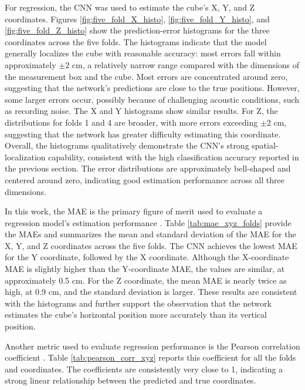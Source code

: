 For regression, the CNN was used to estimate the cube's X, Y, and Z coordinates. Figures \ref{fig:five_fold_X_histo}, \ref{fig:five_fold_Y_histo}, and \ref{fig:five_fold_Z_histo} show the prediction-error histograms for the three coordinates across the five folds. The histograms indicate that the model generally localizes the cube with reasonable accuracy: most errors fall within approximately $\pm 2$ cm, a relatively narrow range compared with the dimensions of the measurement box and the cube. Most errors are concentrated around zero, suggesting that the network's predictions are close to the true positions. However, some larger errors occur, possibly because of challenging acoustic conditions, such as recording noise. The X and Y histograms show similar results. For Z, the distributions for folds 1 and 4 are broader, with more errors exceeding $\pm 2$ cm, suggesting that the network has greater difficulty estimating this coordinate. Overall, the histograms qualitatively demonstrate the CNN's strong spatial-localization capability, consistent with the high classification accuracy reported in the previous section. The error distributions are approximately bell-shaped and centered around zero, indicating good estimation performance across all three dimensions.

In this work, the MAE is the primary figure of merit used to evaluate a regression model's estimation performance \cite{friedmanrecomendation}. Table \ref{tab:mae_xyz_folds} provide the MAEs and summarizes the mean and standard deviation of the MAE for the X, Y, and Z coordinates across the five folds. The CNN achieves the lowest MAE for the Y coordinate, followed by the X coordinate. Although the X-coordinate MAE is slightly higher than the Y-coordinate MAE, the values are similar, at approximately 0.5 cm. For the Z coordinate, the mean MAE is nearly twice as high, at 0.9 cm, and the standard deviation is larger. These results are consistent with the histograms and further support the observation that the network estimates the cube's horizontal position more accurately than its vertical position.

Another metric used to evaluate regression performance is the Pearson correlation coefficient \cite{friedmanrecomendation}. Table \ref{tab:pearson_corr_xyz} reports this coefficient for all the folds and coordinates. The coefficients are consistently very close to 1, indicating a strong linear relationship between the predicted and true coordinates.

